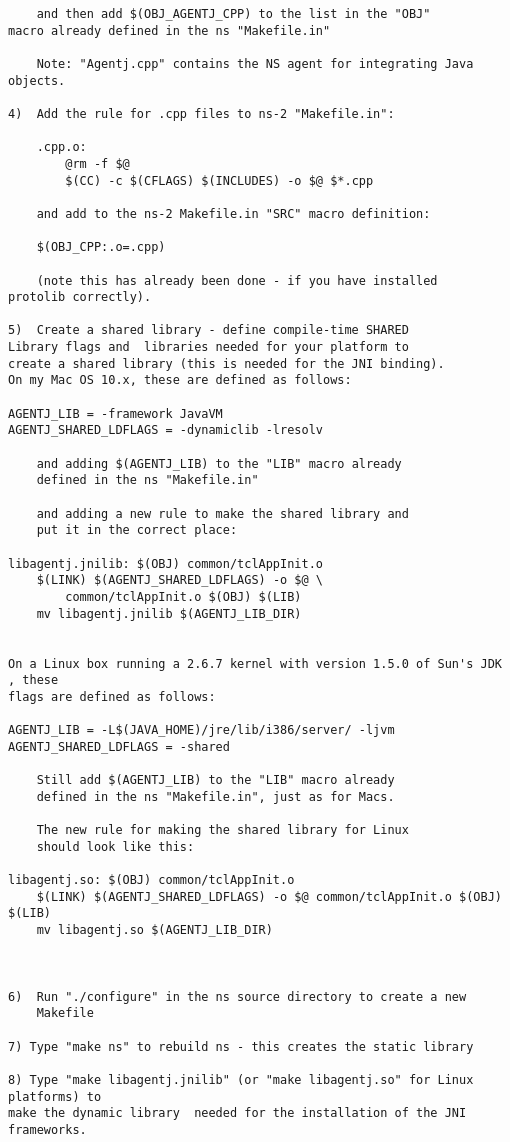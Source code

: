 \begin{verbatim}
    and then add $(OBJ_AGENTJ_CPP) to the list in the "OBJ" 
macro already defined in the ns "Makefile.in"

    Note: "Agentj.cpp" contains the NS agent for integrating Java objects.

4)  Add the rule for .cpp files to ns-2 "Makefile.in":

    .cpp.o:
	    @rm -f $@
	    $(CC) -c $(CFLAGS) $(INCLUDES) -o $@ $*.cpp
        
    and add to the ns-2 Makefile.in "SRC" macro definition:
    
    $(OBJ_CPP:.o=.cpp)

    (note this has already been done - if you have installed 
protolib correctly).

5)  Create a shared library - define compile-time SHARED 
Library flags and  libraries needed for your platform to 
create a shared library (this is needed for the JNI binding). 
On my Mac OS 10.x, these are defined as follows:

AGENTJ_LIB = -framework JavaVM 
AGENTJ_SHARED_LDFLAGS = -dynamiclib -lresolv

    and adding $(AGENTJ_LIB) to the "LIB" macro already
    defined in the ns "Makefile.in"

    and adding a new rule to make the shared library and 
    put it in the correct place:

libagentj.jnilib: $(OBJ) common/tclAppInit.o
	$(LINK) $(AGENTJ_SHARED_LDFLAGS) -o $@ \
		common/tclAppInit.o $(OBJ) $(LIB)
	mv libagentj.jnilib $(AGENTJ_LIB_DIR)
    

On a Linux box running a 2.6.7 kernel with version 1.5.0 of Sun's JDK , these
flags are defined as follows:

AGENTJ_LIB = -L$(JAVA_HOME)/jre/lib/i386/server/ -ljvm
AGENTJ_SHARED_LDFLAGS = -shared

    Still add $(AGENTJ_LIB) to the "LIB" macro already
    defined in the ns "Makefile.in", just as for Macs.

    The new rule for making the shared library for Linux 
    should look like this:

libagentj.so: $(OBJ) common/tclAppInit.o
	$(LINK) $(AGENTJ_SHARED_LDFLAGS) -o $@ common/tclAppInit.o $(OBJ) $(LIB)
	mv libagentj.so $(AGENTJ_LIB_DIR)



6)  Run "./configure" in the ns source directory to create a new
    Makefile 

7) Type "make ns" to rebuild ns - this creates the static library
      
8) Type "make libagentj.jnilib" (or "make libagentj.so" for Linux platforms) to
make the dynamic library  needed for the installation of the JNI frameworks.
\end{verbatim} \normalsize




